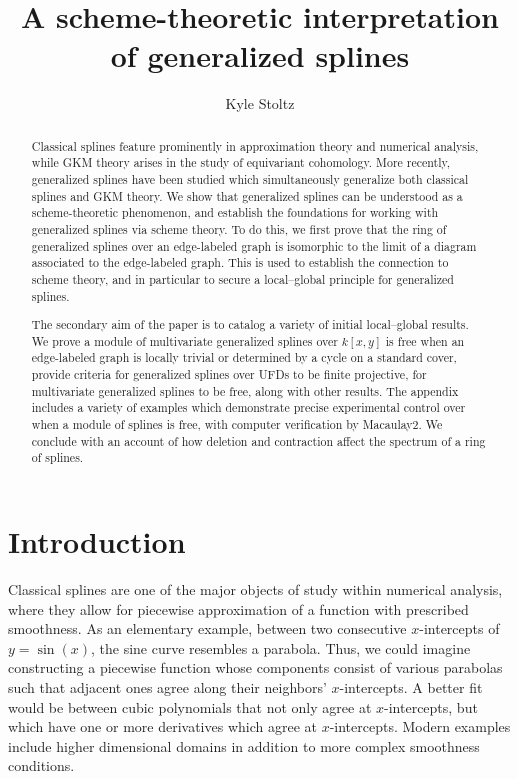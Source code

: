 \documentclass{article}
\title{A scheme-theoretic interpretation of generalized splines}
\author{Kyle Stoltz}
\date{} %
\begin{document}
\maketitle

\begin{abstract}
Classical splines feature prominently in approximation theory and numerical analysis, while GKM theory arises in the study of equivariant cohomology. More recently, generalized splines have been studied which simultaneously generalize both classical splines and GKM theory. We show that generalized splines can be understood as a scheme-theoretic phenomenon, and establish the foundations for working with generalized splines via scheme theory. To do this, we first prove that the ring of generalized splines over an edge-labeled graph is isomorphic to the limit of a diagram associated to the edge-labeled graph. This is used to establish the connection to scheme theory, and in particular to secure a local--global principle for generalized splines.

The secondary aim of the paper is to catalog a variety of initial local--global results. We prove a module of multivariate generalized splines over $k[x,y]$ is free when an edge-labeled graph is locally trivial or determined by a cycle on a standard cover, provide criteria for generalized splines over UFDs to be finite projective, for multivariate generalized splines to be free, along with other results. The appendix includes a variety of examples which demonstrate precise experimental control over when a module of splines is free, with computer verification by Macaulay2. We conclude with an account of how deletion and contraction affect the spectrum of a ring of splines.
\end{abstract}

\section{Introduction}
Classical splines are one of the major objects of study within numerical analysis, where they allow for piecewise approximation of a function with prescribed smoothness. As an elementary example, between two consecutive $x$-intercepts of $y=\sin(x)$, the sine curve resembles a parabola. Thus, we could imagine constructing a piecewise function whose components consist of various parabolas such that adjacent ones agree along their neighbors' $x$-intercepts. A better fit would be between cubic polynomials that not only agree at $x$-intercepts, but which have one or more derivatives which agree at $x$-intercepts. Modern examples include higher dimensional domains in addition to more complex smoothness conditions.
\end{document}
